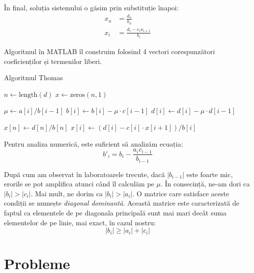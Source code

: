 \documentclass{exam}
\newcommand{\octavescript}[2]{
	
}
\begin{document}
În final, soluția sistemului o găsim prin substituție înapoi:
\begin{align*}
	x_n & = \frac{d_n}{b_n}                 \\
	x_i & = \frac{d_i - c_i x_{i + 1}}{b_i}
\end{align*}

Algoritmul în MATLAB îl construim folosind 4 vectori corespunzători
coeficienților și termenilor liberi.

\newpage
\begin{algorithm}
	\caption{Algoritmul Thomas}
	\begin{algorithmic}[1]
		\State \( n \gets \text{length}(d) \) 
		\State \( x \gets \text{zeros}(n,1) \) 

		\State \( \mu \gets a[i] / b[i-1] \)
		\State \( b[i] \gets b[i] - \mu \cdot c[i-1] \)
		\State \( d[i] \gets d[i] - \mu \cdot d[i-1] \)
		\EndFor

		\State \( x[n] \gets d[n] / b[n] \)
		\State \( x[i] \gets (d[i] - c[i] \cdot x[i+1]) / b[i] \)
		\EndFor
	\end{algorithmic}
\end{algorithm}

Pentru analiza numerică, este suficient să analizăm ecuația:
\begin{equation*}
	b'_i = b_i - \frac{a_i c_{i - 1}}{b_{i - 1}}
\end{equation*}

După cum am observat în laboratoarele trecute, dacă $|b_{i - 1}|$ este foarte mic,
erorile se pot amplifica atunci când îl calculăm pe $\mu$. În consecință, ne-am
dori ca $|b_i| > |c_i|$. Mai mult, ne dorim ca $|b_i| > |a_i|$. O matrice care
satisface aceste condiții se numește \textit{diagonal dominantă}. Această
matrice este caracterizată de faptul ca elementele de pe diagonala principală
sunt mai mari decât suma elementelor de pe linie, mai exact, în cazul nostru:
\begin{equation*}
	|b_i| \geq |a_i| + |c_i|
\end{equation*}

\section{Probleme}
\end{document}
